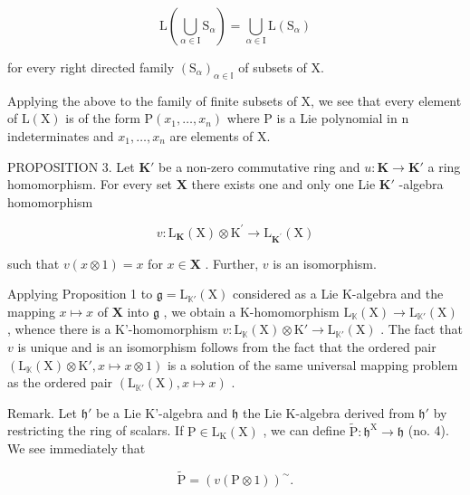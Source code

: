 \[
\mathrm{L} \left(\bigcup_ {\alpha \in \mathrm{I}} \mathrm{S} _ {\alpha}\right) = \bigcup_ {\alpha \in \mathrm{I}} \mathrm{L} (\mathrm{S} _ {\alpha})\tag{7}
\]

for every right directed family \((\mathrm{S}_{\alpha})_{\alpha\in\mathbb{I}}\) of subsets of X.

Applying the above to the family of finite subsets of X, we see that every element of \(\mathrm{L}(\mathrm{X})\) is of the form \(\mathrm{P}(x_{1},\ldots,x_{n})\) where P is a Lie polynomial in n indeterminates and \(x_{1},\ldots,x_{n}\) are elements of X.

PROPOSITION 3. Let \(\mathbf{K}'\) be a non-zero commutative ring and \(u: \mathbf{K} \to \mathbf{K}'\) a ring homomorphism. For every set \(\mathbf{X}\) there exists one and only one Lie \(\mathbf{K}'\) -algebra homomorphism

\[
v \colon \mathrm{L} _ {\mathbf {K}} (\mathrm{X}) \otimes \mathrm{K} ^ {\prime} \rightarrow \mathrm{L} _ {\mathbf {K} ^ {\prime}} (\mathrm{X})
\]

such that \(v(x \otimes 1) = x\) for \(x \in \mathbf{X}\) . Further, \(v\) is an isomorphism.

Applying Proposition 1 to \(\mathfrak{g} = \mathrm{L}_{\mathbb{K}'}(\mathrm{X})\) considered as a Lie K-algebra and the mapping \(x\mapsto x\) of \(\mathbf{X}\) into \(\mathfrak{g}\) , we obtain a K-homomorphism \(\mathrm{L}_{\mathbb{K}}(\mathrm{X})\to \mathrm{L}_{\mathbb{K}'}(\mathrm{X})\) , whence there is a K'-homomorphism \(v\colon \mathrm{L}_{\mathbb{K}}(\mathrm{X})\otimes \mathrm{K}'\to \mathrm{L}_{\mathbb{K}'}(\mathrm{X})\) . The fact that \(v\) is unique and is an isomorphism follows from the fact that the ordered pair \((\mathrm{L}_{\mathbb{K}}(\mathrm{X})\otimes \mathrm{K}',x\mapsto x\otimes 1)\) is a solution of the same universal mapping problem as the ordered pair \((\mathrm{L}_{\mathbb{K}'}(\mathrm{X}),x\mapsto x)\) .

Remark. Let \(\mathfrak{h}'\) be a Lie K'-algebra and \(\mathfrak{h}\) the Lie K-algebra derived from \(\mathfrak{h}'\) by restricting the ring of scalars. If \(\mathrm{P} \in \mathrm{L}_{\mathrm{K}}(\mathrm{X})\) , we can define \(\tilde{\mathrm{P}}: \mathfrak{h}^{\mathrm{X}} \to \mathfrak{h}\) (no. 4). We see immediately that

\[
\tilde {\mathrm{P}} = (v (\mathrm{P} \otimes 1)) ^ {\sim}.
\]
\relax{}
